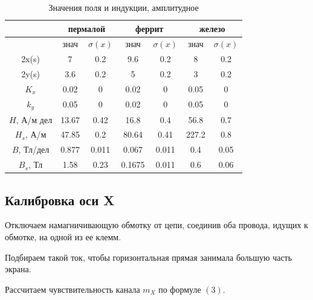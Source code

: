 \documentclass[a4paper, 12pt]{article}%
\begin{document}
	\begin{table}[H]
		\centering
		\begin{tabular}{|c|cc|cc|cc|}
			\hline
			& \multicolumn{2}{c|}{пермалой}      & \multicolumn{2}{c|}{феррит}         & \multicolumn{2}{c|}{железо}       \\ \hline
			& \multicolumn{1}{c|}{знач}  & $\sigma(x)$  & \multicolumn{1}{c|}{знач}   & $\sigma(x)$  & \multicolumn{1}{c|}{знач}  & $\sigma(x)$ \\ \hline
			2x(s) & \multicolumn{1}{c|}{7}     & 0.2   & \multicolumn{1}{c|}{9.6}    & 0.2   & \multicolumn{1}{c|}{8}     & 0.2  \\ \hline
			2y(s) & \multicolumn{1}{c|}{3.6}   & 0.2   & \multicolumn{1}{c|}{5}      & 0.2   & \multicolumn{1}{c|}{3}     & 0.2  \\ \hline
			$K_x$    & \multicolumn{1}{c|}{0.02}  & 0     & \multicolumn{1}{c|}{0.02}   & 0     & \multicolumn{1}{c|}{0.05}  & 0    \\ \hline
			$k_y$    & \multicolumn{1}{c|}{0.05}  & 0     & \multicolumn{1}{c|}{0.02}   & 0     & \multicolumn{1}{c|}{0.05}  & 0    \\ \hline
			$H$, А/м дел     & \multicolumn{1}{c|}{13.67} & 0.42  & \multicolumn{1}{c|}{16.8}   & 0.4   & \multicolumn{1}{c|}{56.8}  & 0.7  \\ \hline
			$H_s$, А/м   & \multicolumn{1}{c|}{47.85} & 0.2   & \multicolumn{1}{c|}{80.64}  & 0.41  & \multicolumn{1}{c|}{227.2} & 0.8  \\ \hline
		$B$, Тл/дел    & \multicolumn{1}{c|}{0.877} & 0.011 & \multicolumn{1}{c|}{0.067}  & 0.011 & \multicolumn{1}{c|}{0.4}   & 0.05 \\ \hline
		$B_s$, Тл   & \multicolumn{1}{c|}{1.58}  & 0.23  & \multicolumn{1}{c|}{0.1675} & 0.011 & \multicolumn{1}{c|}{0.6}   & 0.06 \\ \hline
		\end{tabular}
	\caption{Значения поля и индукции, амплитудное}
		\end{table}
	\subsection*{Калибровка оси X}
	Отключаем намагничивающую обмотку от цепи, соединив оба провода, идущих к обмотке, на одной из ее клемм. 
	
	Подбираем такой ток, чтобы горизонтальная прямая занимала большую часть экрана.
	
	Рассчитаем чувствительность канала $m_X$ по формуле $(3)$. 
	
\end{document}
